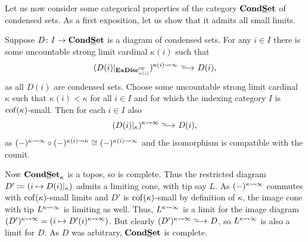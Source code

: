 Let us now consider some categorical properties of the category ${{{\mathbf{Cond}}}{{\mathbf{\underline{S}et}}}}$ of condensed sets. As a first exposition, let us show that it admits all small limits.
\begin{remark}
	\label{remark: the category of condensed sets is complete}
	
	Suppose $D\colon I\to {{{\mathbf{Cond}}}{{\mathbf{\underline{S}et}}}}$ is a diagram of condensed sets. For any $i\in I$ there is some uncountable strong limit cardinal $\kappa(i)$ such that
	$$(D(i)\vert_{\boundedExtremallyDisconnectedSets{\kappa(i)}^\op})^\enlargementsymbol{\kappa(i)}{\infty} \isorightarrow D(i),$$
	as all $D(i)$ are condensed sets. Choose some uncountable strong limit cardinal $\kappa$ such that $\kappa(i) < \kappa$ for all $i\in I$ and for which the indexing category $I$ is ${\operatorname{cof}(\kappa)}$-small. Then for each $i\in I$ also
	$$(D(i)\resTo{\kappa})^\enlargementsymbol{\kappa}{\infty}\isorightarrow D(i),$$
	as $(-)^{\kappa\rightsquigarrow \infty}\circ (-)^{\kappa(i)\rightsquigarrow \kappa} \cong (-)^{\kappa(i)\rightsquigarrow \infty}$ and the isomorphism is compatible with the counit.
	
	Now ${{{\mathbf{Cond}}}{{\mathbf{\underline{S}et}}}_{\kappa}}$ is a topos, so is complete. Thus the restricted diagram $D'\coloneqq (i\mapsto D(i){\vert_{\kappa}})$ admits a limiting cone, with tip say $L$. As $(-)^{\kappa\rightsquigarrow \infty}$ commutes with ${\operatorname{cof}(\kappa)}$-small limits and $D'$ is ${\operatorname{cof}(\kappa)}$-small by definition of $\kappa$, the image cone with tip $L^{\kappa\rightsquigarrow \infty}$ is limiting as well. Thus, $L^{\kappa\rightsquigarrow \infty}$ is a limit for the image diagram $(D')^{\kappa\rightsquigarrow \infty} = (i\mapsto D'(i)^{\kappa\rightsquigarrow \infty})$. But clearly $(D')^\enlargementsymbol{\kappa}{\infty}\isorightarrow D$, so $L^{\kappa\rightsquigarrow \infty}$ is also a limit for $D$. As $D$ was arbitrary, ${{{\mathbf{Cond}}}{{\mathbf{\underline{S}et}}}}$ is complete.
	
\end{remark}

